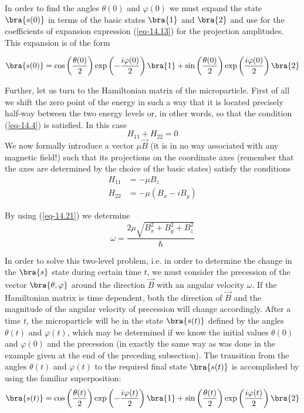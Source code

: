 \documentclass[a4paper,sfsidenotes,colorlinks=true]{tufte-book}
\numberwithin{equation}{section}
\numberwithin{figure}{section}
\begin{document}
In order to find the angles $\theta (0)$ and $\varphi (0)$ we must expand the state
 $\bra{s (0)}$ in terms of the basic states  $\bra{1}$ and $\bra{2}$ and use for the
coefficients of expansion expression (\ref{eq-14.13}) for the projection
amplitudes. This expansion is of the form


\begin{equation}%
\bra{s(0)}  = \cos \left( \frac{\theta (0)}{2} \right) \exp
\left( - \frac{ i \varphi(0)}{2} \right) \bra{1} + \sin \left( \frac{\theta(0)}{2} \right) \exp
\left( \frac{ i \varphi(0)}{2} \right) \bra{2}  
\label{eq-14.19}
\end{equation}

Further, let us turn to the Hamiltonian matrix of the
microparticle. First of all we shift the zero point of the energy in
such a way that it is located precisely half-way between the two
energy levels or, in other words, so that the condition (\ref{eq-14.4}) is
satisfied. In this case
\begin{equation}%
H_{11}+ H_{22} = 0
\label{eq-14.20} 
\end{equation}
We now formally introduce a vector $\mu \vec{B}$ (it is in no way associated with
any magnetic field!) such that its projections on the coordinate
axes (remember that the axes are determined by the choice of the basic
states) satisfy the conditions
\begin{equation}%
\begin{split}
H_{11} & = - \mu B_{z}\\
H_{22} & = - \mu (B_{x} - i B_{y})
\end{split}
\label{eq-14.21} 
\end{equation}

By using (\ref{eq-14.21}) we determine 
\begin{equation}%
\omega =  \frac{2 \mu \sqrt{B_{x}^{2}+ B_{y}^{2} + B_{z}^{2}}}{\hbar}
\label{eq-14.22} 
\end{equation}

In order to solve this two-level problem, i.e. in order to determine
the change in the $\bra{s}$ state during certain time $t$, we must
consider the precession of the vector $\bra{\theta, \varphi}$ around
the direction $\vec{B}$ with an angular velocity $\omega$. If the
Hamiltonian matrix is time dependent, both the direction of $\vec{B}$ and the
magnitude of the angular velocity of precession will change
accordingly. After a time $t$, the microparticle will be in the state $\bra{s(t)}$ defined by the angles $\theta(t)$ and $\varphi (t)$, which may be determined
if we know the initial values $\theta(0)$ and $\varphi (0)$ and the precession (in
exactly the same way as was done in the example given at the end of
the preceding subsection). The transition from the angles $\theta(t)$
and $\varphi (t)$ to the required final state  $\bra{s(t)}$ is accomplished by using
the familiar superposition:
\begin{equation}%
\bra{s(t)}  = \cos \left( \frac{\theta (t)}{2} \right) \exp
\left( - \frac{ i \varphi(t)}{2} \right) \bra{1} + \sin \left( \frac{\theta(t)}{2} \right) \exp
\left( \frac{ i \varphi(t)}{2} \right) \bra{2}  
\label{eq-14.23}
\end{equation}
\end{document}
